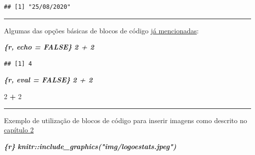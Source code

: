 \documentclass[
]{book}
\newenvironment{Shaded}{\begin{snugshade}}{\end{snugshade}}
\newcommand{\DecValTok}[1]{\textcolor[rgb]{0.00,0.00,0.81}{#1}}
\newcommand{\InformationTok}[1]{\textcolor[rgb]{0.56,0.35,0.01}{\textbf{\textit{#1}}}}
\newcommand{\OperatorTok}[1]{\textcolor[rgb]{0.81,0.36,0.00}{\textbf{#1}}}
\newcommand{\StringTok}[1]{\textcolor[rgb]{0.31,0.60,0.02}{#1}}
\begin{document}
\begin{verbatim}
## [1] "25/08/2020"
\end{verbatim}

\begin{center}\rule{0.5\linewidth}{0.5pt}\end{center}

Algumas das opções básicas de blocos de código \protect\hyperlink{flags}{já mencionadas}:

\begin{Shaded}
\begin{Highlighting}[]
\InformationTok{\textasciigrave{}\textasciigrave{}\textasciigrave{}\{r, echo = FALSE\}}
\InformationTok{2 + 2}
\InformationTok{\textasciigrave{}\textasciigrave{}\textasciigrave{}}
\end{Highlighting}
\end{Shaded}

\begin{verbatim}
## [1] 4
\end{verbatim}

\begin{Shaded}
\begin{Highlighting}[]
\InformationTok{\textasciigrave{}\textasciigrave{}\textasciigrave{}\{r, eval = FALSE\}}
\InformationTok{2 + 2}
\InformationTok{\textasciigrave{}\textasciigrave{}\textasciigrave{}}
\end{Highlighting}
\end{Shaded}

\begin{Shaded}
\begin{Highlighting}[]
\DecValTok{2} \OperatorTok{+}\StringTok{ }\DecValTok{2}
\end{Highlighting}
\end{Shaded}

\begin{center}\rule{0.5\linewidth}{0.5pt}\end{center}

Exemplo de utilização de blocos de código para inserir imagens como descrito no \protect\hyperlink{inserindo-imagens}{capítulo 2}

\begin{Shaded}
\begin{Highlighting}[]
\InformationTok{\textasciigrave{}\textasciigrave{}\textasciigrave{}\{r\}}
\InformationTok{knitr::include\_graphics("img/logoestats.jpeg")}
\InformationTok{\textasciigrave{}\textasciigrave{}\textasciigrave{}}
\end{Highlighting}
\end{Shaded}
\end{document}
